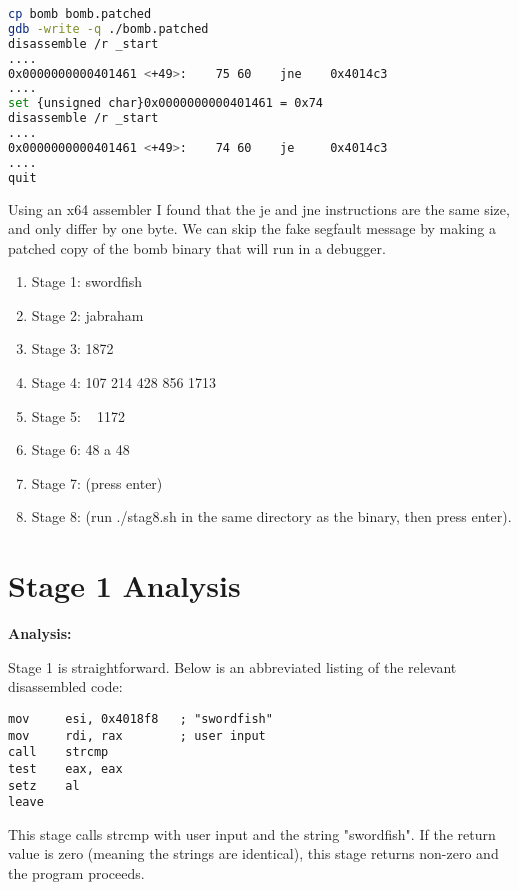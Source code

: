 \documentclass{article}
\begin{document}
\begin{lstlisting}[language=bash]
cp bomb bomb.patched
gdb -write -q ./bomb.patched
disassemble /r _start
....
0x0000000000401461 <+49>:    75 60    jne    0x4014c3
....
set {unsigned char}0x0000000000401461 = 0x74
disassemble /r _start
....
0x0000000000401461 <+49>:    74 60    je     0x4014c3
....
quit
\end{lstlisting}

Using an x64 assembler I found that the je and jne instructions are the same
size, and only differ by one byte.  We can skip the fake segfault message by
making a patched copy of the bomb binary that will run in a debugger.

\begin{enumerate}
  \item Stage 1: swordfish
  \item Stage 2: jabraham
  \item Stage 3: 1872
  \item Stage 4: 107 214 428 856 1713
  \item Stage 5: ~ 1172 ~
  \item Stage 6: 48 a 48
  \item Stage 7: (press enter)
  \item Stage 8: (run ./stag8.sh in the same directory as the binary, then 
  press enter).
\end{enumerate}

\newpage
\section{Stage 1 Analysis}
\begin{flushleft}
\vspace{.5pc}
\end{flushleft}

\begin{flushleft}
\textbf{Analysis:}
\vspace{.5pc}
\end{flushleft}

\par
Stage 1 is straightforward.  Below is an abbreviated listing of the relevant
disassembled code:
\begin{lstlisting}
mov     esi, 0x4018f8   ; "swordfish"
mov     rdi, rax        ; user input
call    strcmp
test    eax, eax
setz    al
leave
\end{lstlisting}
\par
This stage calls strcmp with user input and the string "swordfish".  If the 
return value is zero (meaning the strings are identical), this stage returns 
non-zero and the program proceeds.
\end{document}
